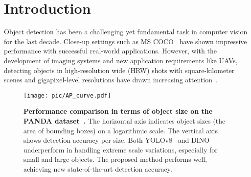 \section{Introduction}
\label{sec:intro}
Object detection has been a challenging yet fundamental task in computer vision for the last decade. Close-up settings such as MS COCO~\cite{lin2014microsoft} have shown impressive performance with successful real-world applications. However, with the development of imaging systems and new application requirements like UAVs, detecting objects in high-resolution wide (HRW) shots with square-kilometer scenes and gigapixel-level resolutions have drawn increasing attention~\cite{chen2022towards,fan2022speed,han2021align,li2022oriented,najibi2019autofocus,pan2020dynamic,yang2022scrdet++,zhang2019cad,wang2024group,lin2023realgraph,ma2024visual,lin2024gigatraj}. 

\begin{figure}[!]
\centering
		\texttt{[image: pic/AP\_curve.pdf]}
        \vspace{-20pt}
	\caption{\textbf{Performance comparison in terms of object size on the PANDA dataset~\cite{wang2020panda}.} The horizontal axis indicates object sizes (the area of bounding boxes) on a logarithmic scale. The vertical axis shows detection accuracy per size. Both YOLOv8~\cite{yolov8} and DINO~\cite{zhang2022dino} underperform in handling extreme scale variations, especially for small and large objects. The proposed method performs well, achieving new state-of-the-art detection accuracy. 
    }
    \vspace{-12pt}
	\label{fig:sparse_challege}	
\end{figure}


